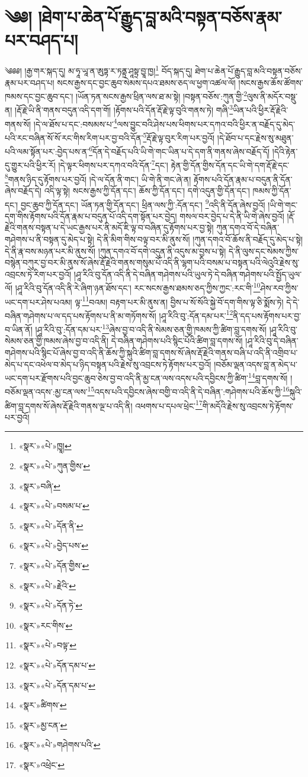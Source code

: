 \chapter{༄༅། །ཐེག་པ་ཆེན་པོ་རྒྱུད་བླ་མའི་བསྟན་བཅོས་རྣམ་པར་བཤད་པ།}༄༅༅། །རྒྱ་གར་སྐད་དུ། མ་ཧཱ་ཡཱ་ན་ཨུཏྟ་ར་ཏནྟྲ་ཤཱསྟྲ་བྱཱ་ཁྱ།\footnote{«སྣར་»«པེ་»ཁྱཱ།} བོད་སྐད་དུ། ཐེག་པ་ཆེན་པོ་རྒྱུད་བླ་མའི་བསྟན་བཅོས་རྣམ་པར་བཤད་པ། སངས་རྒྱས་དང་བྱང་ཆུབ་སེམས་དཔའ་ཐམས་ཅད་ལ་ཕྱག་འཚལ་ལོ། །སངས་རྒྱས་ཆོས་ཚོགས་ཁམས་དང་བྱང་ཆུབ་དང་། །ཡོན་ཏན་སངས་རྒྱས་ཕྲིན་ལས་ཐ་མ་སྟེ། །བསྟན་བཅོས་:ཀུན་གྱི་\footnote{«སྣར་»«པེ་»ཀུན་གྱིས་}ལུས་ནི་མདོར་བསྡུ་ན། །རྡོ་རྗེ་ཡི་ནི་གནས་བདུན་འདི་དག་གོ། །རྟོགས་པའི་དོན་རྡོ་རྗེ་ལྟ་བུའི་གནས་ཏེ། གཞི་\footnote{«སྣར་»བཞི་}ཡིན་པའི་ཕྱིར་རྡོ་རྗེའི་གནས་སོ། །དེ་ལ་ཐོས་པ་དང་:བསམས་པ་\footnote{«སྣར་»«པེ་»བསམ་པ་}ལས་བྱུང་བའི་ཤེས་པས་ཕིགས་པར་དཀའ་བའི་ཕྱིར་ན་བརྗོད་དུ་མེད་པའི་རང་བཞིན་སོ་སོ་རང་གིས་རིག་པར་བྱ་བའི་དོན་\footnote{«སྣར་»«པེ་»དོན་ནི་}རྡོ་རྗེ་ལྟ་བུར་རིག་པར་བྱའོ། །དེ་ཐོབ་པ་དང་རྗེས་སུ་མཐུན་པའི་ལམ་སྟོན་པར་:བྱེད་པས་ན་\footnote{«སྣར་»«པེ་»བྱེད་པས་}དོན་དེ་བརྗོད་པའི་ཡི་གེ་གང་ཡིན་པ་དེ་དག་ནི་གནས་ཞེས་བརྗོད་དོ། །དེའི་རྟེན་དུ་གྱུར་པའི་ཕྱིར་རོ། །དེ་ལྟར་ཕིགས་པར་དཀའ་བའི་དོན་\footnote{«སྣར་»«པེ་»དོན་གྱིས་}དང་། རྟེན་གྱི་དོན་གྱིས་དོན་དང་ཡི་གེ་དག་རྡོ་རྗེ་དང་\footnote{«སྣར་»«པེ་»རྗེའི་}གནས་ཉིད་དུ་རྟོགས་པར་བྱའོ། །དེ་ལ་དོན་ནི་གང་། ཡི་གེ་ནི་གང་ཞེ་ན། རྟོགས་པའི་དོན་རྣམ་པ་བདུན་ནི་དོན་ཞེས་བརྗོད་དེ། འདི་ལྟ་སྟེ། སངས་རྒྱས་ཀྱི་དོན་དང་། ཆོས་ཀྱི་དོན་དང་། དགེ་འདུན་གྱི་དོན་དང་། ཁམས་ཀྱི་དོན་དང་། བྱང་ཆུབ་ཀྱི་དོན་དང་། ཡོན་ཏན་གྱི་དོན་དང་། ཕྲིན་ལས་ཀྱི་:དོན་དང་། \footnote{«སྣར་»«པེ་»དོན་ཏེ་}འདི་ནི་དོན་ཞེས་བྱའོ། །ཡི་གེ་གང་དག་གིས་རྟོགས་པའི་དོན་རྣམ་པ་བདུན་པོ་འདི་དག་སྟོན་པར་བྱེད། གསལ་བར་བྱེད་པ་དེ་ནི་ཡི་གེ་ཞེས་བྱའོ། །རྡོ་རྗེའི་གནས་བསྟན་པ་དེ་ཡང་རྒྱས་པར་ནི་མདོ་ཇི་ལྟ་བ་བཞིན་དུ་རྟོགས་པར་བྱ་སྟེ། ཀུན་དགའ་བོ་དེ་བཞིན་གཤེགས་པ་ནི་བསྟན་དུ་མེད་པ་སྟེ། དེ་ནི་མིག་གིས་བལྟ་བར་མི་ནུས་སོ། །ཀུན་དགའ་བོ་ཆོས་ནི་བརྗོད་དུ་མེད་པ་སྟེ། དེ་ནི་རྣ་བས་མཉན་པར་མི་ནུས་སོ། །ཀུན་དགའ་བོ་དགེ་འདུན་ནི་འདུས་མ་བྱས་པ་སྟེ། དེ་ནི་ལུས་དང་སེམས་ཀྱིས་བསྙེན་བཀུར་བྱ་བར་མི་ནུས་སོ་ཞེས་རྡོ་རྗེའི་གནས་གསུམ་པོ་འདི་ནི་ལྷག་པའི་བསམ་པ་བསྟན་པའི་ལེའུའི་རྗེས་སུ་འབྲངས་ཏེ་རིག་པར་བྱའོ། །ཤཱ་རིའི་བུ་དོན་འདི་ནི་དེ་བཞིན་གཤེགས་པའི་ཡུལ་ཏེ་དེ་བཞིན་གཤེགས་པའི་སྤྱོད་ཡུལ་ལོ། །ཤཱ་རིའི་བུ་དོན་འདི་ནི་རེ་ཞིག་ཉན་ཐོས་དང་། རང་སངས་རྒྱས་ཐམས་ཅད་ཀྱིས་ཀྱང་:རང་གི་\footnote{«སྣར་»རང་གིས་}ཤེས་རབ་ཀྱིས་ཡང་དག་པར་ཤེས་པའམ། ལྟ་\footnote{«སྣར་»«པེ་»བལྟ་}བའམ། བརྟག་པར་མི་ནུས་ན། བྱིས་པ་སོ་སོའི་སྐྱེ་བོ་དག་གིས་ལྟ་ཅི་སྨོས་ཏེ། དེ་དེ་བཞིན་གཤེགས་པ་ལ་དད་པས་རྟོགས་པ་ནི་མ་གཏོགས་སོ། །ཤཱ་རིའི་བུ་:དོན་དམ་པར་\footnote{«སྣར་»«པེ་»དོན་དམ་པ་}ནི་དད་པས་རྟོགས་པར་བྱ་བ་ཡིན་ནོ། །ཤཱ་རིའི་བུ་:དོན་དམ་པར་\footnote{«སྣར་»«པེ་»དོན་དམ་པ་}ཞེས་བྱ་བ་འདི་ནི་སེམས་ཅན་གྱི་ཁམས་ཀྱི་ཚིག་བླ་དགས་སོ། །ཤཱ་རིའི་བུ་སེམས་ཅན་གྱི་ཁམས་ཞེས་བྱ་བ་འདི་ནི། དེ་བཞིན་གཤེགས་པའི་སྙིང་པོའི་ཚིག་བླ་དགས་སོ། །ཤཱ་རིའི་བུ་དེ་བཞིན་གཤེགས་པའི་སྙིང་པོ་ཞེས་བྱ་བ་འདི་ནི་ཆོས་ཀྱི་སྐུའི་ཚིག་བླ་དགས་སོ་ཞེས་རྡོ་རྗེའི་གནས་བཞི་པ་འདི་ནི་འགྲིབ་པ་མེད་པ་དང་འཕེལ་བ་མེད་པ་ཉིད་བསྟན་པའི་རྗེས་སུ་འབྲངས་ཏེ་རྟོགས་པར་བྱའོ། །བཅོམ་ལྡན་འདས་བླ་ན་མེད་པ་ཡང་དག་པར་རྫོགས་པའི་བྱང་ཆུབ་ཅེས་བྱ་བ་འདི་ནི་མྱ་ངན་ལས་འདས་པའི་དབྱིངས་ཀྱི་ཚིག་\footnote{«སྣར་»ཚིགས་}བླ་དགས་སོ། །བཅོམ་ལྡན་འདས་:མྱ་ངན་ལས་\footnote{«སྣར་»མྱ་ངན་}འདས་པའི་དབྱིངས་ཞེས་བགྱི་བ་འདི་ནི་དེ་བཞིན་:གཤེགས་པའི་ཆོས་ཀྱི་\footnote{«སྣར་»«པེ་»གཤེགས་པའི་}སྐུའི་ཚིག་བླ་དགས་སོ་ཞེས་རྡོ་རྗེའི་གནས་ལྔ་པ་འདི་ནི། འཕགས་པ་དཔལ་ཕྲེང་\footnote{«སྣར་»འཕྲེང་}གི་མདོའི་རྗེས་སུ་འབྲངས་ཏེ་རྟོགས་པར་བྱའོ། 